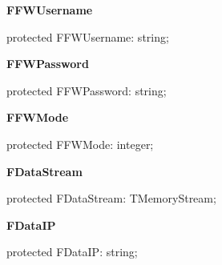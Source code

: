 \documentclass{report}
\newif\ifpdf
\begin{document}
\begin{list}{}
\par  \label{ftpsend.TFTPSend-FFWUsername}
\item[\textbf{FFWUsername}\hfill]
\ifpdf
\begin{flushleft}
\fi
\begin{ttfamily}
protected FFWUsername: string;\end{ttfamily}

\ifpdf
\end{flushleft}
\fi


\par  \label{ftpsend.TFTPSend-FFWPassword}
\item[\textbf{FFWPassword}\hfill]
\ifpdf
\begin{flushleft}
\fi
\begin{ttfamily}
protected FFWPassword: string;\end{ttfamily}

\ifpdf
\end{flushleft}
\fi


\par  \label{ftpsend.TFTPSend-FFWMode}
\item[\textbf{FFWMode}\hfill]
\ifpdf
\begin{flushleft}
\fi
\begin{ttfamily}
protected FFWMode: integer;\end{ttfamily}

\ifpdf
\end{flushleft}
\fi


\par  \label{ftpsend.TFTPSend-FDataStream}
\item[\textbf{FDataStream}\hfill]
\ifpdf
\begin{flushleft}
\fi
\begin{ttfamily}
protected FDataStream: TMemoryStream;\end{ttfamily}

\ifpdf
\end{flushleft}
\fi


\par  \label{ftpsend.TFTPSend-FDataIP}
\item[\textbf{FDataIP}\hfill]
\ifpdf
\begin{flushleft}
\fi
\begin{ttfamily}
protected FDataIP: string;\end{ttfamily}

\ifpdf
\end{flushleft}
\fi



\end{list}
\end{document}
